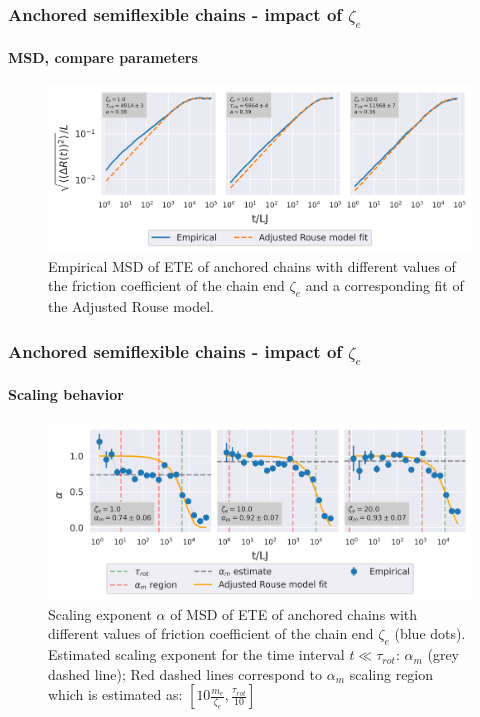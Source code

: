 \documentclass[handout]{beamer}
\begin{document}
\begin{frame}
    \frametitle{Anchored semiflexible chains - impact of $\zeta_e$}
    \framesubtitle{MSD, compare parameters}
    \begin{figure}[h]
        \includegraphics[width=\textwidth]{14+15+16-exp-msd-log-arm_fit-log.png}
        \caption{Empirical MSD of ETE of anchored chains with different values of
        the friction coefficient of the chain end $\zeta_e$ and a corresponding fit
        of the Adjusted Rouse model.
        }
    \end{figure}
\end{frame}


\begin{frame}
    \frametitle{Anchored semiflexible chains - impact of $\zeta_e$}
    \framesubtitle{Scaling behavior}
    \begin{figure}[h]
        \includegraphics[width=\textwidth]{14+15+16-exp-alpha.png}
        \caption{Scaling exponent $\alpha$ of MSD of ETE 
        of anchored chains with different values of
        friction coefficient of the chain end $\zeta_e$ (blue dots).
        Estimated scaling exponent for the time interval
        $t \ll \tau_{rot}$: $\alpha_m$ (grey dashed line); Red dashed lines
        correspond to $\alpha_m$ scaling region which is estimated as:
        $[10 \frac{m_e}{\zeta_e}, \frac{\tau_{rot}}{10}]$
        }
    \end{figure}
\end{frame}
\end{document}
